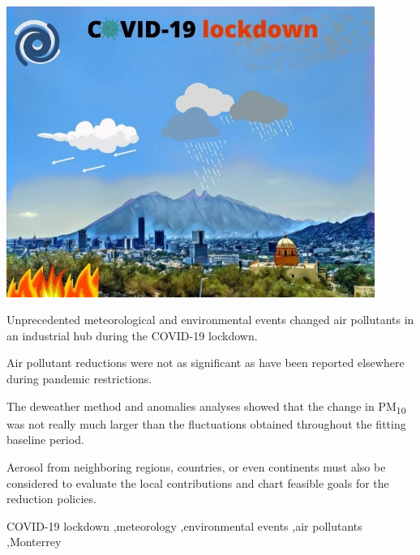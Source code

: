 \documentclass[preprint,12pt]{elsarticle}
\begin{document}
\begin{frontmatter}
\begin{abstract}
	\end{abstract}
	\begin{graphicalabstract}
		\includegraphics[width=12cm]{COVID-19_lockdown.jpg}
	\end{graphicalabstract}
	\begin{highlights}
		\item Unprecedented meteorological and environmental events changed air pollutants in an industrial hub during the COVID-19 lockdown.
		\item Air pollutant reductions were not as significant as have been reported elsewhere during pandemic restrictions.
		\item The deweather method and anomalies analyses showed that the change in PM\textsubscript{10} was not really much larger than the fluctuations obtained throughout the fitting baseline period.
		\item Aerosol from neighboring regions, countries, or even continents must also be considered to evaluate the local contributions and chart feasible goals for the reduction policies.
	\end{highlights}
	\begin{keyword}
		COVID-19 lockdown \sep meteorology  \sep environmental events \sep air pollutants \sep Monterrey
	\end{keyword}
\end{frontmatter}
\end{document}
